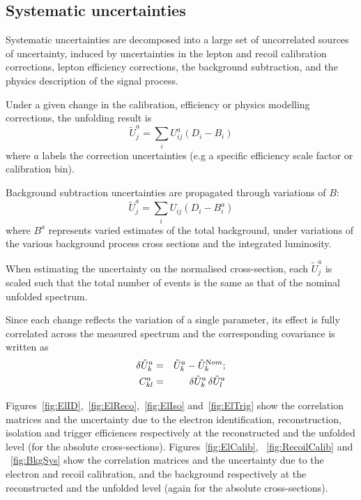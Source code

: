 \subsection{Systematic uncertainties}

Systematic uncertainties are decomposed into a large set of uncorrelated sources of uncertainty, induced by uncertainties in the lepton and recoil calibration corrections, lepton efficiency
corrections, the background subtraction, and the physics description of the signal process.

Under a given change in the calibration, efficiency or physics modelling corrections, the unfolding result is
\begin{equation}
\tilde{U}_j^a = \sum_{i}  U_{ij}^a (D_i - B_i)
\end{equation}
\noindent where $a$ labels the correction uncertainties (e.g a specific efficiency scale factor or calibration bin).

Background subtraction uncertainties are propagated through variations of $B$:
\begin{equation}
\tilde{U}_j^a = \sum_{i} U_{ij} (D_i - B_i^a)
\end{equation}
where $B^a$ represents varied estimates of the total background, under variations of the various background process cross sections and the integrated luminosity.

When estimating the uncertainty on the normalised cross-section, each $\tilde{U}_j^a$ is scaled such that the total number of events is the same as that of the nominal unfolded spectrum.

Since each change reflects the variation of a single parameter, its effect is fully correlated across the measured spectrum and the corresponding covariance is written as
\begin{eqnarray}
\delta \tilde{U}_k^a &=& \tilde{U}_k^a - \tilde{U}_k^{\textrm Nom};\\
C_{kl}^a &=& \delta \tilde{U}_k^a \, \delta \tilde{U}_l^a
\end{eqnarray}

Figures~\ref{fig:ElID},~\ref{fig:ElReco},~\ref{fig:ElIso} and~\ref{fig:ElTrig} show the correlation matrices and the uncertainty due to the electron identification, reconstruction, isolation and trigger efficiences respectively at the reconstructed and the unfolded level (for the absolute cross-sections). Figures~\ref{fig:ElCalib}, ~\ref{fig:RecoilCalib} and ~\ref{fig:BkgSys} show the correlation matrices and the uncertainty due to the electron and recoil calibration, and the background respectively at the reconstructed and the unfolded level (again for the absolute cross-sections).

